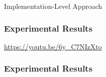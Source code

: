 \begin{frame}{Implementation-Level Approach}
    \begin{figure}
        \centerline{}
    \end{figure}
\end{frame}


\begin{frame}
    \frametitle{Experimental Results}
    \centering
    \LARGE
    \textcolor{blue}{\url{https://youtu.be/6y\_C7NIzXto}}
\end{frame}

\begin{frame}
    \frametitle{Experimental Results}
    \begin{figure}[h]
        \centering
        \resizebox{0.9\textwidth}{!}{}
    \end{figure}
\end{frame}
